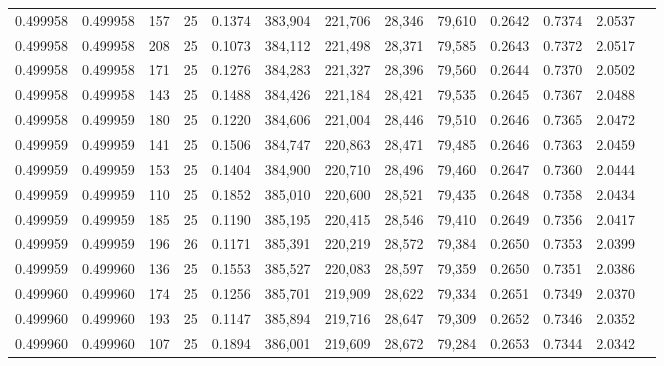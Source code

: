 \begin{tabular}{rrrrrrrrrrrrr}
0.499958 & 0.499958 &   157 &  25 &                                     0.1374 & 383,904 & 221,706 &  28,346 &  79,610 & 0.2642 & 0.7374 & 2.0537 \\
0.499958 & 0.499958 &   208 &  25 &                                     0.1073 & 384,112 & 221,498 &  28,371 &  79,585 & 0.2643 & 0.7372 & 2.0517 \\
0.499958 & 0.499958 &   171 &  25 &                                     0.1276 & 384,283 & 221,327 &  28,396 &  79,560 & 0.2644 & 0.7370 & 2.0502 \\
0.499958 & 0.499958 &   143 &  25 &                                     0.1488 & 384,426 & 221,184 &  28,421 &  79,535 & 0.2645 & 0.7367 & 2.0488 \\
0.499958 & 0.499959 &   180 &  25 &                                     0.1220 & 384,606 & 221,004 &  28,446 &  79,510 & 0.2646 & 0.7365 & 2.0472 \\
0.499959 & 0.499959 &   141 &  25 &                                     0.1506 & 384,747 & 220,863 &  28,471 &  79,485 & 0.2646 & 0.7363 & 2.0459 \\
0.499959 & 0.499959 &   153 &  25 &                                     0.1404 & 384,900 & 220,710 &  28,496 &  79,460 & 0.2647 & 0.7360 & 2.0444 \\
0.499959 & 0.499959 &   110 &  25 &                                     0.1852 & 385,010 & 220,600 &  28,521 &  79,435 & 0.2648 & 0.7358 & 2.0434 \\
0.499959 & 0.499959 &   185 &  25 &                                     0.1190 & 385,195 & 220,415 &  28,546 &  79,410 & 0.2649 & 0.7356 & 2.0417 \\
0.499959 & 0.499959 &   196 &  26 &                                     0.1171 & 385,391 & 220,219 &  28,572 &  79,384 & 0.2650 & 0.7353 & 2.0399 \\
0.499959 & 0.499960 &   136 &  25 &                                     0.1553 & 385,527 & 220,083 &  28,597 &  79,359 & 0.2650 & 0.7351 & 2.0386 \\
0.499960 & 0.499960 &   174 &  25 &                                     0.1256 & 385,701 & 219,909 &  28,622 &  79,334 & 0.2651 & 0.7349 & 2.0370 \\
0.499960 & 0.499960 &   193 &  25 &                                     0.1147 & 385,894 & 219,716 &  28,647 &  79,309 & 0.2652 & 0.7346 & 2.0352 \\
0.499960 & 0.499960 &   107 &  25 &                                     0.1894 & 386,001 & 219,609 &  28,672 &  79,284 & 0.2653 & 0.7344 & 2.0342 \\

\end{tabular}

